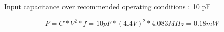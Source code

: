 \documentclass[dvips,10pt,twocolumn]{article}
\begin{document}
  Input capacitance over recommended operating conditions : 10 pF
  \begin{center}
  \begin{equation}
  P = C * V^2 * f = 10 pF * (4.4 V)^2 * 4.083 MHz = 0.18 mW
  \end{equation}
  \end{center}
  

{}

\end{document}
